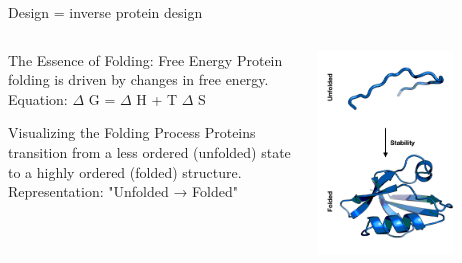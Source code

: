 \documentclass[presentation,smaller]{beamer}
\begin{document}
\begin{frame}[label={sec:orgebc87a4}]{Design = inverse protein design}
\begin{columns}
\begin{column}{0.5\columnwidth}
\begin{block}{The Essence of Folding: Free Energy}
Protein folding is driven by changes in free energy.
Equation: \(\Delta\) G = \(\Delta\) H + T \(\Delta\) S
\end{block}

\begin{block}{Visualizing the Folding Process}
Proteins transition from a less ordered (unfolded) state to a highly ordered
(folded) structure. Representation: "Unfolded → Folded"
\end{block}
\end{column}

\begin{column}{0.5\columnwidth}
\begin{center}
\includegraphics[width=0.7\textwidth]{./img/s1_f3.png}
\end{center}
\end{column}
\end{columns}
\end{frame}
\end{document}
